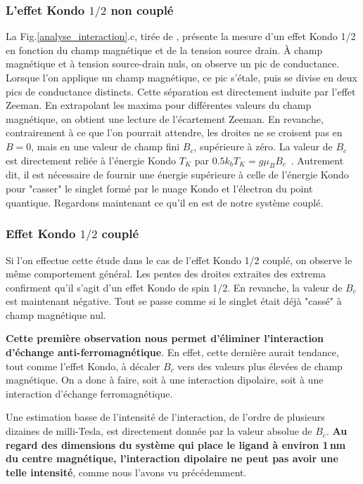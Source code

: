 \subsubsection{L'effet Kondo $1/2$ non couplé}
La Fig.\ref{analyse_interaction}.c, tirée de \cite{Roch2009}, présente la mesure d'un effet Kondo 1/2 en fonction du champ magnétique et de la tension source drain. \`A champ magnétique et  à tension source-drain nuls, on observe un pic de conductance. Lorsque l'on applique un champ magnétique, ce pic s'étale, puis se divise en deux pics de conductance distincts. Cette séparation est directement induite par l'effet Zeeman. En extrapolant les maxima pour différentes valeurs du champ magnétique, on obtient une lecture de l'écartement Zeeman. En revanche, contrairement à ce que l'on pourrait attendre, les droites ne se croisent pas en $B=0$, mais en une valeur de champ fini $B_c$, supérieure à zéro. La valeur de $B_c$ est directement reliée à l'énergie Kondo $T_K$ par $0.5 k_bT_K = g \mu_B B_c$~\cite{Roch2009}. Autrement dit, il est nécessaire de fournir une énergie supérieure à celle de l'énergie Kondo pour "casser" le singlet formé par le nuage Kondo et l'électron du point quantique. Regardons maintenant ce qu'il en est de notre système couplé.

\subsubsection{Effet Kondo $1/2$ couplé} 
Si l'on effectue cette étude dans le cas de l'effet Kondo 1/2 couplé, on observe le même comportement général. Les pentes des droites extraites des extrema confirment qu'il s'agit d'un effet Kondo de spin 1/2. En revanche, la valeur de $B_c$ est maintenant négative. Tout se passe comme si le singlet était déjà "cassé" à champ magnétique nul. 

\textbf{Cette première observation nous permet d'éliminer l'interaction d'échange anti-ferromagnétique}. En effet, cette dernière aurait tendance, tout comme l'effet Kondo, à décaler $B_c$ vers des valeurs plus élevées de champ magnétique. On a donc à faire, soit à une interaction dipolaire, soit à une interaction d'échange ferromagnétique.

Une estimation basse de l'intensité de l'interaction, de l'ordre de plusieurs dizaines de milli-Tesla, est directement donnée par la valeur absolue de $B_c$. \textbf{Au regard des dimensions du système qui place le ligand à environ 1\,nm du centre magnétique, l'interaction dipolaire ne peut pas avoir une telle intensité}, comme nous l'avons vu précédemment. 

